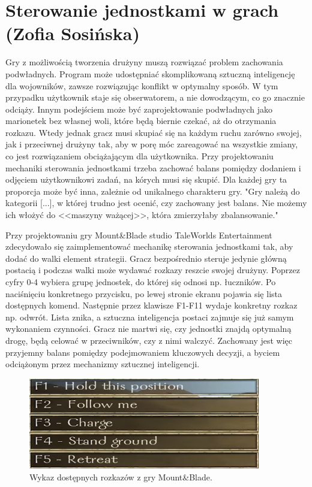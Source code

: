 \section{Sterowanie jednostkami w grach (Zofia Sosińska)}\label{chap:mb}
Gry z możliwością tworzenia drużyny muszą rozwiązać problem zachowania podwładnych. Program może udostępniać
skomplikowaną sztuczną inteligencję dla wojowników, zawsze rozwiązując konflikt w optymalny sposób. W tym przypadku
użytkownik staje się obserwatorem, a nie dowodzącym, co go znacznie odciąży. Innym podejściem może być zaprojektowanie podwładnych jako 
marionetek bez własnej woli, które będą biernie czekać, aż do otrzymania rozkazu. Wtedy jednak gracz musi skupiać się na 
każdym ruchu zarówno swojej, jak i przeciwnej drużyny tak, aby w porę móc zareagować na wszystkie zmiany, co
jest rozwiązaniem obciążającym dla użytkownika. Przy projektowaniu mechaniki sterowania jednostkami trzeba zachować balans pomiędzy 
dodaniem i odjęciem użytkownikowi zadań, na kórych musi się skupić. Dla każdej gry ta proporcja może być inna, zależnie
od unikalnego charakteru gry. "Gry należą do kategorii [...], w której trudno jest ocenić, czy zachowany jest balans.
 Nie możemy ich włożyć do <<maszyny ważącej>>, która zmierzyłaby zbalansowanie."\cite{balancing_game}

Przy projektowaniu gry Mount\&Blade studio TaleWorlds Entertainment zdecydowało się zaimplementować mechanikę sterowania jednostkami tak, aby 
dodać do walki element strategii. Gracz bezpośrednio steruje jedynie główną postacią i podczas walki może wydawać rozkazy reszcie swojej drużyny. Poprzez
cyfry 0-4 wybiera grupę jednostek, do której się odnosi np. łuczników. Po naciśnięciu konkretnego przycisku, po lewej stronie ekranu pojawia się lista dostępnych komend.
Następnie przez klawisze F1-F11 wydaje konkretny rozkaz np. odwrót. Lista znika, a sztuczna inteligencja postaci zajmuje się już samym wykonaniem czynności.
Gracz nie martwi się, czy jednostki znajdą optymalną drogę, 
będą celować w przeciwników, czy z nimi walczyć. Zachowany jest więc przyjemny balans pomiędzy podejmowaniem kluczowych decyzji, a byciem odciążonym przez mechanizmy sztucznej inteligencji.

\begin{figure}[h!tbp]
    \centering
    \includegraphics[width=0.9\textwidth]{images/ui/commandsMountBla.png}
    \caption{Wykaz dostępnych rozkazów z gry Mount\&Blade.}\label{fig:MountnBlade}
    \label{fig:mnb}
\end{figure}
